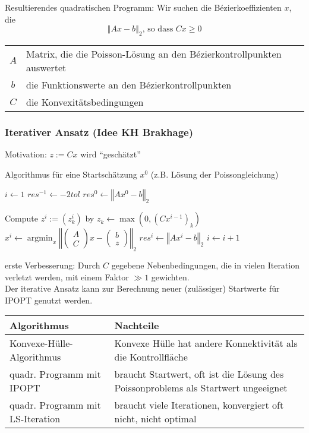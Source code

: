 \documentclass[a4paper,11pt]{article}
\newcommand{\argmin}{\operatorname{argmin}}
\begin{document}
	Resultierendes quadratischen Programm: Wir suchen die B\'ezierkoeffizienten $x$, die
	\[
		\left\Vert  Ax - b \right\Vert_2 \text{, so dass } Cx \geq 0  
	\]
	
	\begin{tabular}{cl}
		$A$ & Matrix, die die Poisson-Lösung an den B\'ezierkontrollpunkten auswertet \\
		$b$ & die Funktionswerte an den B\'ezierkontrollpunkten \\
		$C$ & die Konvexitätsbedingungen
	\end{tabular}
	
	\subsubsection*{Iterativer Ansatz (Idee KH Brakhage)}
	Motivation: $z:=Cx$ wird ``geschätzt''
	
	Algorithmus für eine Startschätzung $x^0$ (z.B. Lösung der Poissongleichung)
	\begin{algorithmic}
		\State $i \gets 1$
		\State $res^{-1} \gets -2tol$
		\State $res^{0} \gets \left\Vert Ax^0-b \right\Vert_2$
						
		\State Compute $z^i := (z_k^i)$ by $z_k \gets \max(0, (Cx^{i-1})_k)$ 
		\State $x^i \gets \argmin_x
		\left\Vert
		\begin{pmatrix} 
		A\\ 
		C
		\end{pmatrix}
		x - 
		\begin{pmatrix} 
		b \\ 
		z 
		\end{pmatrix} 
		\right\Vert_2
		$
		\State $res^i \gets \left\Vert Ax^i-b \right\Vert_2$
		\State $i\gets i+1$
		\EndWhile
	\end{algorithmic}

	
	erste Verbesserung: Durch $C$ gegebene Nebenbedingungen, die in vielen Iteration verletzt werden, mit einem Faktor $\gg 1$ gewichten. 
	\\
	Der iterative Ansatz kann zur Berechnung neuer (zulässiger) Startwerte für IPOPT genutzt werden.
	

\vspace{1cm}

\begin{tabularx}{1\textwidth}{%
p{3cm}| %
X %
}
\textbf{Algorithmus} & \textbf{Nachteile}\\
\hline %
Konvexe-Hülle-Algorithmus & Konvexe Hülle hat andere Konnektivität als die Kontrollfläche\\
\hline %
quadr. Programm mit IPOPT &  braucht Startwert, oft ist die Lösung des Poissonproblems als Startwert ungeeignet\\
\hline
quadr. Programm mit LS-Iteration &  braucht viele Iterationen, konvergiert oft nicht, nicht optimal\\
\end{tabularx}
\end{document}
